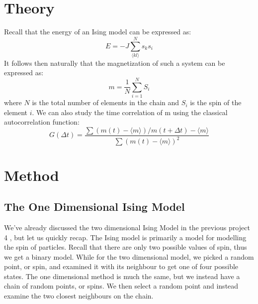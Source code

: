 \documentclass{article}
\begin{document}
\section{Theory}
Recall \cite{proj4} that the energy of an Ising model can be expressed as:
\begin{equation*}
    E = - J \sum_{\langle kl \rangle}^N s_k s_i
\end{equation*}
It follows then naturally that the magnetization of such a system can be expressed as:
\begin{equation}
    m = \frac{1}{N} \sum_{i=1}^N S_i
\end{equation}
where $N$ is the total number of elements in the chain and $S_i$ is the spin of the element $i$. \newline
We can also study the time correlation of m using the classical autocorrelation function:
\begin{equation}
    G(\Delta t) = \frac{\sum (m(t) - \langle m \rangle)/m(t+ \Delta t) - \langle m \rangle}{\sum (m(t) - \langle m \rangle)^2}
\end{equation}
\newpage
\section{Method}
\subsection{The One Dimensional Ising Model}
We've already discussed the two dimensional Ising Model in the previous project 4 \cite{proj4}, but let us quickly recap. \newline
The Ising model is primarily a model for modelling the spin of particles. Recall that there are only two possible values of spin, thus we get a binary model. \newline
While for the two dimensional model, we picked a random point, or spin, and examined it with its neighbour to get one of four possible states. The one dimensional method is much the same, but we instead have a chain of random points, or spins. We then select a random point and instead examine the two closest neighbours on the chain.
\end{document}
